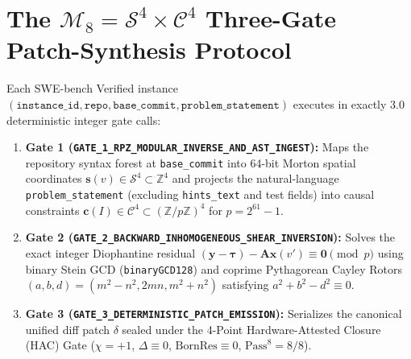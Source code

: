 \documentclass[11pt,a4paper]{article}
\begin{document}
\section{The $\mathcal{M}_8 = \mathcal{S}^4 \times \mathcal{C}^4$ Three-Gate Patch-Synthesis Protocol}
Each SWE-bench Verified instance $(\texttt{instance\_id}, \texttt{repo}, \texttt{base\_commit}, \texttt{problem\_statement})$ executes in exactly $3.0$ deterministic integer gate calls:
\begin{enumerate}
  \item \textbf{Gate 1 (\texttt{GATE\_1\_RPZ\_MODULAR\_INVERSE\_AND\_AST\_INGEST}):} Maps the repository syntax forest at \texttt{base\_commit} into 64-bit Morton spatial coordinates $\mathbf{s}(v) \in \mathcal{S}^4 \subset \mathbb{Z}^4$ and projects the natural-language \texttt{problem\_statement} (excluding \texttt{hints\_text} and test fields) into causal constraints $\mathbf{c}(I) \in \mathcal{C}^4 \subset (\mathbb{Z}/p\mathbb{Z})^4$ for $p = 2^{61}-1$.
  \item \textbf{Gate 2 (\texttt{GATE\_2\_BACKWARD\_INHOMOGENEOUS\_SHEAR\_INVERSION}):} Solves the exact integer Diophantine residual $(\mathbf{y} - \boldsymbol{\tau}) - \mathbf{A}\mathbf{x}(v') \equiv \mathbf{0} \pmod p$ using binary Stein GCD (\texttt{binaryGCD128}) and coprime Pythagorean Cayley Rotors $(a,b,d) = (m^2-n^2, 2mn, m^2+n^2)$ satisfying $a^2 + b^2 - d^2 \equiv 0$.
  \item \textbf{Gate 3 (\texttt{GATE\_3\_DETERMINISTIC\_PATCH\_EMISSION}):} Serializes the canonical unified diff patch $\delta$ sealed under the 4-Point Hardware-Attested Closure (HAC) Gate ($\chi = +1$, $\Delta \equiv 0$, $\text{BornRes} \equiv 0$, $\text{Pass}^8 = 8/8$).
\end{enumerate}
\end{document}
